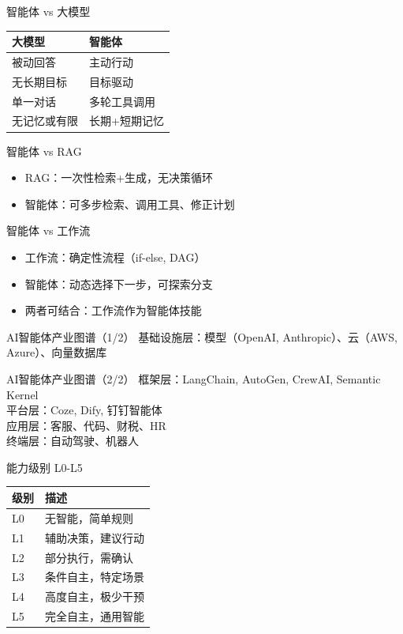 \begin{frame}{智能体 vs 大模型}
\begin{tabular}{p{}p{}}
\toprule
大模型 & 智能体 \\
\midrule
被动回答 & 主动行动 \\
无长期目标 & 目标驱动 \\
单一对话 & 多轮工具调用 \\
无记忆或有限 & 长期+短期记忆 \\
\bottomrule
\end{tabular}
\end{frame}

\begin{frame}{智能体 vs RAG}
\begin{itemize}
\item RAG：一次性检索+生成，无决策循环
\item 智能体：可多步检索、调用工具、修正计划
\end{itemize}
\end{frame}

\begin{frame}{智能体 vs 工作流}
\begin{itemize}
\item 工作流：确定性流程（if-else, DAG）
\item 智能体：动态选择下一步，可探索分支
\item 两者可结合：工作流作为智能体技能
\end{itemize}
\end{frame}

\begin{frame}{AI智能体产业图谱（1/2）}
基础设施层：模型（OpenAI, Anthropic）、云（AWS, Azure）、向量数据库
\end{frame}
\begin{frame}{AI智能体产业图谱（2/2）}
框架层：LangChain, AutoGen, CrewAI, Semantic Kernel \\
平台层：Coze, Dify, 钉钉智能体 \\
应用层：客服、代码、财税、HR \\
终端层：自动驾驶、机器人
\end{frame}

\begin{frame}{能力级别 L0-L5}
\begin{tabular}{ll}
\toprule
级别 & 描述 \\
\midrule
L0 & 无智能，简单规则 \\
L1 & 辅助决策，建议行动 \\
L2 & 部分执行，需确认 \\
L3 & 条件自主，特定场景 \\
L4 & 高度自主，极少干预 \\
L5 & 完全自主，通用智能 \\
\bottomrule
\end{tabular}
\end{frame}

